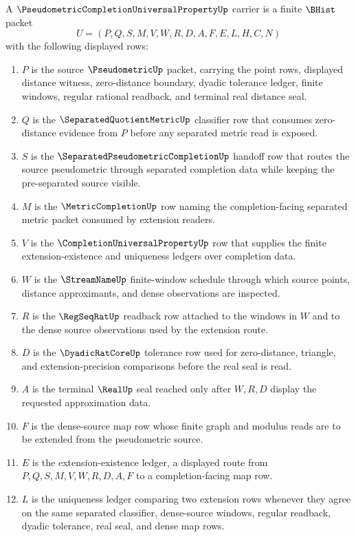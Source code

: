 \begin{definition}
\label{def:pseudometric-completion-universal-property-carrier}
A $\PseudometricCompletionUniversalPropertyUp$ carrier is a finite $\BHist$ packet
$$
U=(P,Q,S,M,V,W,R,D,A,F,E,L,H,C,N)
$$
with the following displayed rows:
\begin{enumerate}
\item $P$ is the source $\PseudometricUp$ packet, carrying the point rows, displayed distance witness, zero-distance boundary, dyadic tolerance ledger, finite windows, regular rational readback, and terminal real distance seal.
\item $Q$ is the $\SeparatedQuotientMetricUp$ classifier row that consumes zero-distance evidence from $P$ before any separated metric read is exposed.
\item $S$ is the $\SeparatedPseudometricCompletionUp$ handoff row that routes the source pseudometric through separated completion data while keeping the pre-separated source visible.
\item $M$ is the $\MetricCompletionUp$ row naming the completion-facing separated metric packet consumed by extension readers.
\item $V$ is the $\CompletionUniversalPropertyUp$ row that supplies the finite extension-existence and uniqueness ledgers over completion data.
\item $W$ is the $\StreamNameUp$ finite-window schedule through which source points, distance approximants, and dense observations are inspected.
\item $R$ is the $\RegSeqRatUp$ readback row attached to the windows in $W$ and to the dense source observations used by the extension route.
\item $D$ is the $\DyadicRatCoreUp$ tolerance row used for zero-distance, triangle, and extension-precision comparisons before the real seal is read.
\item $A$ is the terminal $\RealUp$ seal reached only after $W,R,D$ display the requested approximation data.
\item $F$ is the dense-source map row whose finite graph and modulus reads are to be extended from the pseudometric source.
\item $E$ is the extension-existence ledger, a displayed route from $P,Q,S,M,V,W,R,D,A,F$ to a completion-facing map row.
\item $L$ is the uniqueness ledger comparing two extension rows whenever they agree on the same separated classifier, dense-source windows, regular readback, dyadic tolerance, real seal, and dense map rows.

\end{enumerate}
\end{definition}
